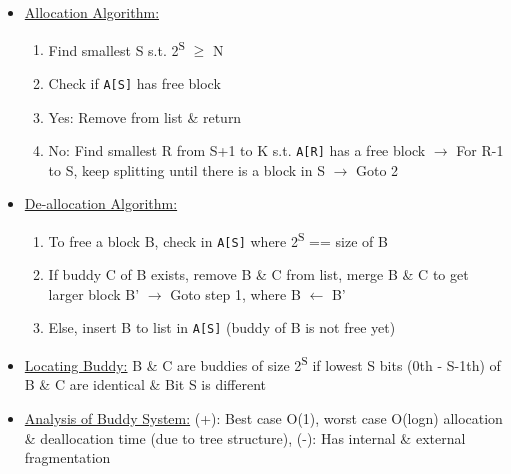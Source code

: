 \documentclass[landscape]{article}
\begin{document}
\begin{multicols*}{6}
\begin{itemize}
\begin{itemize}
        \item \underline{Allocation Algorithm:}
        \begin{enumerate}
          \item Find smallest S s.t. 2\textsuperscript{S} $\geq$ N 
          \item Check if \verb|A[S]| has free block
          \item Yes: Remove from list \& return
          \item No: Find smallest R from S+1 to K s.t. \verb|A[R]| has a free block $\rightarrow$ For R-1 to S, keep splitting until there is a block in S $\rightarrow$ Goto 2
        \end{enumerate}
        \item \underline{De-allocation Algorithm:}
        \begin{enumerate}
          \item To free a block B, check in \verb|A[S]| where 2\textsuperscript{S} == size of B
          \item If buddy C of B exists, remove B \& C from list, merge B \& C to get larger block B' $\rightarrow$ Goto step 1, where B $\leftarrow$ B'
          \item Else, insert B to list in \verb|A[S]| (buddy of B is not free yet)
        \end{enumerate}
        \item \underline{Locating Buddy:} B \& C are buddies of size 2\textsuperscript{S} if lowest S bits (0th - S-1th) of B \& C are identical \& Bit S is different
        \item \underline{Analysis of Buddy System:} (+): Best case O(1), worst case O(logn) allocation \& deallocation time (due to tree structure), (-): Has internal \& external fragmentation
      \end{itemize}
    \end{itemize}
  \end{multicols*}
\end{document}

